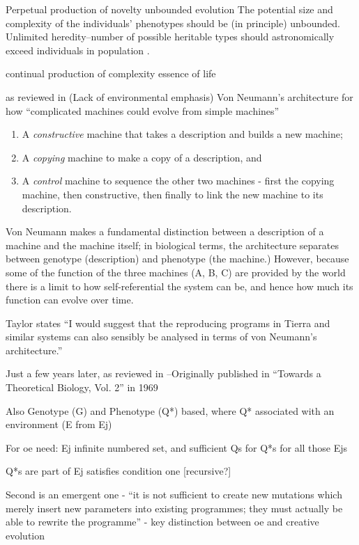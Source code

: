 \begin{DRAFT}
Perpetual production of novelty
unbounded evolution
The potential size and complexity of the individuals' phenotypes should be (in principle) unbounded.  \parencite{Soros2014}
Unlimited heredity--number of possible heritable types should astronomically exceed individuals in population \parencite{Vasas2015}.

continual production of complexity
essence of life

\autocite{VonNeumann1966} as reviewed in \autocite{Taylor1999} (Lack of environmental emphasis)
Von Neumann's architecture for how ``complicated machines could evolve from simple machines''

\begin{enumerate}[label=\Alph*]
	\item A \emph{constructive} machine that takes a description and builds a new machine;
	\item A \emph{copying} machine to make a copy of a description, and 
	\item A \emph{control} machine to sequence the other two machines - first the copying machine, then constructive, then finally to link the new machine to its description.
\end{enumerate}

Von Neumann makes a fundamental distinction between a description of a machine and the machine itself; in biological terms, the architecture separates between genotype (description) and phenotype (the machine.) However, because some of the function of the three machines (A, B, C) are provided by the world there is a limit to how self-referential the system can be, and hence how much its function can evolve over time.

Taylor states ``I would suggest that the reproducing programs in Tierra and similar systems can also sensibly be analysed in terms of von Neumann's architecture.''

Just a few years later, \autocite{Waddington2008} as reviewed in \autocite{Taylor:1999sc}--Originally published in ``Towards a Theoretical Biology, Vol. 2'' in 1969

Also Genotype (G) and Phenotype (Q*) based, where Q* associated with an environment (E from Ej)

For \gls{oe} need: Ej infinite numbered set, and sufficient Qs for Q*s for all those Ejs

Q*s are part of Ej satisfies condition one {[}recursive?{]}

Second is an emergent one - ``it is not sufficient to create new mutations which merely insert new parameters into existing programmes; they must actually be able to rewrite the programme''
- key distinction between \gls{oe} and creative evolution


\end{DRAFT}
